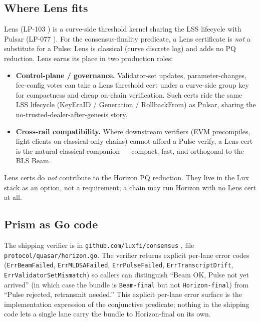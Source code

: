 \subsection{Where Lens fits}

Lens (LP-103 \cite{lp103}) is a curve-side threshold kernel sharing the LSS lifecycle with Pulsar (LP-077 \cite{lp077}). For the consensus-finality predicate, a Lens certificate is \emph{not} a substitute for a Pulse: Lens is classical (curve discrete log) and adds no PQ reduction. Lens earns its place in two production roles:
\begin{itemize}[leftmargin=2em,nosep]
  \item \textbf{Control-plane / governance.} Validator-set updates, parameter-changes, fee-config votes can take a Lens threshold cert under a curve-side group key for compactness and cheap on-chain verification. Such certs ride the same LSS lifecycle (KeyEraID / Generation / RollbackFrom) as Pulsar, sharing the no-trusted-dealer-after-genesis story.
  \item \textbf{Cross-rail compatibility.} Where downstream verifiers (EVM precompiles, light clients on classical-only chains) cannot afford a Pulse verify, a Lens cert is the natural classical companion --- compact, fast, and orthogonal to the BLS Beam.
\end{itemize}
Lens certs do \emph{not} contribute to the Horizon PQ reduction. They live in the Lux stack as an option, not a requirement; a chain may run Horizon with no Lens cert at all.

\subsection{Prism as Go code}

The shipping verifier is in \texttt{github.com/luxfi/consensus} \cite{consensusgo}, file \texttt{protocol/quasar/horizon.go}. The verifier returns explicit per-lane error codes (\texttt{ErrBeamFailed}, \texttt{ErrMLDSAFailed}, \texttt{ErrPulseFailed}, \texttt{ErrTranscriptDrift}, \texttt{ErrValidatorSetMismatch}) so callers can distinguish ``Beam OK, Pulse not yet arrived'' (in which case the bundle is \texttt{Beam-final} but not \texttt{Horizon-final}) from ``Pulse rejected, retransmit needed.'' This explicit per-lane error surface is the implementation expression of the conjunctive predicate; nothing in the shipping code lets a single lane carry the bundle to Horizon-final on its own.
